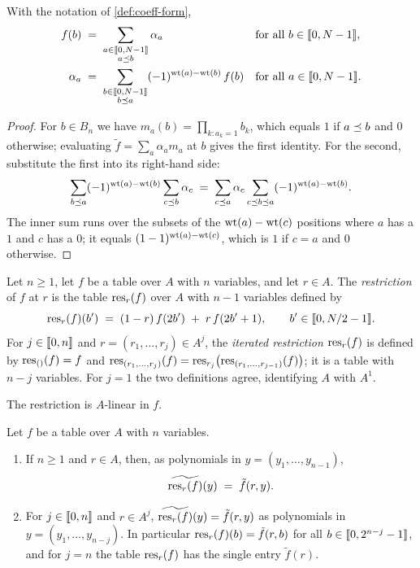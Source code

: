 \begin{lemma}\label{lem:mobius}
With the notation of \cref{def:coeff-form},
\begin{align*}
  f(b) &\;=\; \sum_{\substack{a \in \llbracket 0, N-1 \rrbracket \\ a \preceq b}} \alpha_a && \text{for all } b \in \llbracket 0, N-1 \rrbracket, \\
  \alpha_a &\;=\; \sum_{\substack{b \in \llbracket 0, N-1 \rrbracket \\ b \preceq a}} (-1)^{\mathrm{wt}(a)-\mathrm{wt}(b)}\, f(b) && \text{for all } a \in \llbracket 0, N-1 \rrbracket.
\end{align*}
\end{lemma}

\begin{proof}
For $b \in B_n$ we have $m_a(b) = \prod_{k : a_k = 1} b_k$, which equals $1$ if $a \preceq b$ and $0$ otherwise; evaluating $\tilde f = \sum_a \alpha_a m_a$ at $b$ gives the first identity.
For the second, substitute the first into its right-hand side:
\[
  \sum_{b \preceq a} (-1)^{\mathrm{wt}(a)-\mathrm{wt}(b)} \sum_{c \preceq b} \alpha_c
  \;=\; \sum_{c \preceq a} \alpha_c \sum_{c \preceq b \preceq a} (-1)^{\mathrm{wt}(a)-\mathrm{wt}(b)} .
\]
The inner sum runs over the subsets of the $\mathrm{wt}(a) - \mathrm{wt}(c)$ positions where $a$ has a $1$ and $c$ has a $0$; it equals $(1-1)^{\mathrm{wt}(a)-\mathrm{wt}(c)}$, which is $1$ if $c = a$ and $0$ otherwise.
\end{proof}

\begin{definition}[Restriction]\label{def:restriction}
Let $n \ge 1$, let $f$ be a table over $A$ with $n$ variables, and let $r \in A$.
The \emph{restriction} of $f$ at $r$ is the table $\mathrm{res}_r(f)$ over $A$ with $n-1$ variables defined by
\[
  \mathrm{res}_r(f)(b') \;=\; (1-r)\, f(2b') \;+\; r\, f(2b'+1), \qquad b' \in \llbracket 0, N/2-1 \rrbracket.
\]
For $j \in \llbracket 0, n \rrbracket$ and $r = (r_1,\dots,r_j) \in A^j$, the \emph{iterated restriction} $\mathrm{res}_r(f)$ is defined by $\mathrm{res}_{()}(f) = f$ and $\mathrm{res}_{(r_1,\dots,r_j)}(f) = \mathrm{res}_{r_j}\bigl(\mathrm{res}_{(r_1,\dots,r_{j-1})}(f)\bigr)$; it is a table with $n-j$ variables.
For $j = 1$ the two definitions agree, identifying $A$ with $A^1$.
\end{definition}

The restriction is $A$-linear in $f$.

\begin{lemma}\label{lem:restriction}
Let $f$ be a table over $A$ with $n$ variables.
\begin{enumerate}
  \item If $n \ge 1$ and $r \in A$, then, as polynomials in $y = (y_1,\dots,y_{n-1})$,
  \[
    \widetilde{\mathrm{res}_r(f)}(y) \;=\; \tilde f(r, y).
  \]
  \item For $j \in \llbracket 0, n \rrbracket$ and $r \in A^j$, $\widetilde{\mathrm{res}_r(f)}(y) = \tilde f(r, y)$ as polynomials in $y = (y_1,\dots,y_{n-j})$.
  In particular $\mathrm{res}_r(f)(b) = \tilde f(r, b)$ for all $b \in \llbracket 0, 2^{n-j}-1 \rrbracket$, and for $j = n$ the table $\mathrm{res}_r(f)$ has the single entry $\tilde f(r)$.
\end{enumerate}
\end{lemma}

